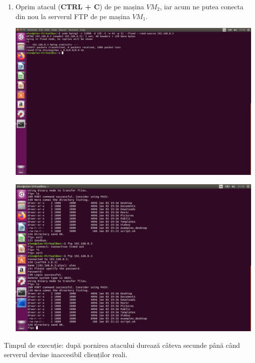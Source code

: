\documentclass[a4paper]{article}
\begin{document}
\begin{enumerate}
    \item Oprim atacul (\textbf{CTRL + C}) de pe mașina $ VM_2 $, iar acum ne putea conecta din nou la serverul FTP de pe mașina $ VM_1 $.
    
    \begin{center}
        \hspace*{-1.8cm}                                          \includegraphics[scale=0.64]{"./img/pas7.png"}       
    \end{center}
    
    \begin{center}
        \hspace*{-1.8cm}                                          \includegraphics[scale=0.64]{"./img/pas8.png"}       
    \end{center}
    
\end{enumerate}

Timpul de execuție: după pornirea atacului durează câteva secunde până când serverul devine inaccesibil clienților reali.
\end{document}
